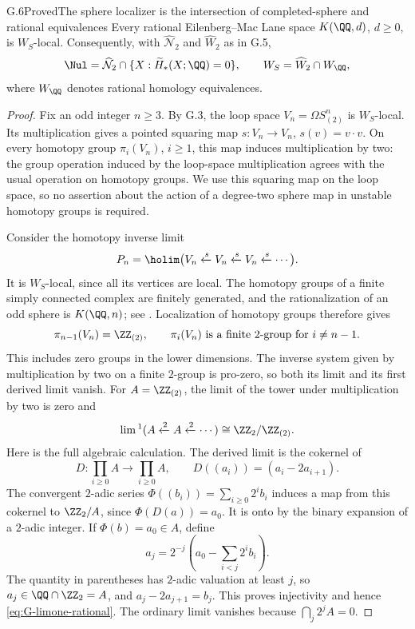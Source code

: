 \begin{claim}{G.6}{Proved}{The sphere localizer is the intersection of completed-sphere and rational equivalences}
Every rational Eilenberg--Mac Lane space $K(\QQ,d)$, $d\geq0$, is $W_S$-local. Consequently, with $\widehat{\mathcal N}_2$ and $\widehat W_2$ as in G.5,
\[
 \Nul=\widehat{\mathcal N}_2\cap
       \{X:\widetilde H_*(X;\QQ)=0\},
 \qquad
 W_S=\widehat W_2\cap W_{\QQ},
\]
where $W_{\QQ}$ denotes rational homology equivalences.
\end{claim}
\begin{proof}
Fix an odd integer $n\geq3$. By G.3, the loop space $V_n=\Omega S^n_{(2)}$ is $W_S$-local. Its multiplication gives a pointed squaring map $s:V_n\to V_n$, $s(v)=v\cdot v$. On every homotopy group $\pi_i(V_n)$, $i\geq1$, this map induces multiplication by two: the group operation induced by the loop-space multiplication agrees with the usual operation on homotopy groups. We use this squaring map on the loop space, so no assertion about the action of a degree-two sphere map in unstable homotopy groups is required.

Consider the homotopy inverse limit
\[
 P_n=\holim\bigl(V_n\xleftarrow{s}V_n\xleftarrow{s}V_n\xleftarrow{s}\cdots\bigr).
\]
It is $W_S$-local, since all its vertices are local. The homotopy groups of a finite simply connected complex are finitely generated, and the rationalization of an odd sphere is $K(\QQ,n)$; see \cite[Theorem 4.5.2 and Corollary 6.7.3]{FGHMayPonto2012}. Localization of homotopy groups therefore gives
\[
 \pi_{n-1}(V_n)=\ZZ_{(2)},
 \qquad
 \pi_i(V_n)\text{ is a finite }2\text{-group for }i\ne n-1.
\]
This includes zero groups in the lower dimensions. The inverse system given by multiplication by two on a finite $2$-group is pro-zero, so both its limit and its first derived limit vanish. For $A=\ZZ_{(2)}$, the limit of the tower under multiplication by two is zero and
\begin{equation}\label{eq:G-limone-rational}
 \lim{}^1(A\xleftarrow{2}A\xleftarrow{2}\cdots)
       \cong \ZZ_2/\ZZ_{(2)}.
\end{equation}
Here is the full algebraic calculation. The derived limit is the cokernel of
\[
 D:\prod_{i\geq0}A\longrightarrow\prod_{i\geq0}A,
 \qquad D((a_i))=(a_i-2a_{i+1}).
\]
The convergent $2$-adic series
$\Phi((b_i))=\sum_{i\geq0}2^i b_i$
induces a map from this cokernel to $\ZZ_2/A$, since
$\Phi(D(a))=a_0$. It is onto by the binary expansion of a $2$-adic integer. If $\Phi(b)=a_0\in A$, define
\[
 a_j=2^{-j}\left(a_0-\sum_{i<j}2^i b_i\right).
\]
The quantity in parentheses has $2$-adic valuation at least $j$, so $a_j\in\QQ\cap\ZZ_2=A$, and $a_j-2a_{j+1}=b_j$. This proves injectivity and hence \eqref{eq:G-limone-rational}. The ordinary limit vanishes because $\bigcap_j2^j A=0$.


\end{proof}
